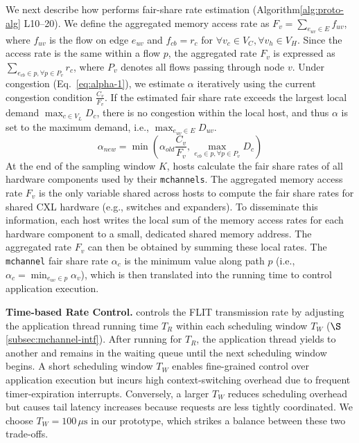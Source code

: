 We next describe how \sys performs fair-share rate estimation (Algorithm\ref{alg:proto-alg} L10--20). We define the aggregated memory access rate as \(F_v = \sum_{e_{uv} \in E} f_{uv}\), where \(f_{uv}\) is the flow on edge \(e_{uv}\) and \(f_{cb} = r_c\) for \(\forall v_c \in V_C, \forall v_h \in V_H\). Since the access rate is the same within a flow \(p\), the aggregated rate \(F_v\) is expressed as \(\sum_{e_{cb} \in p, \forall p \in P_v} r_c\), where \(P_v\) denotes all flows passing through node \(v\). Under congestion (Eq.~\ref{eq:alpha-1}), we estimate \(\alpha\) iteratively using the current congestion condition \(\frac{C_v}{F_v}\). If the estimated fair share rate exceeds the largest local demand \(\max_{c \in V_L} D_c\), there is no congestion within the local host, and thus \(\alpha\) is set to the maximum demand, i.e., \(\max_{e_{uv}\in E} D_{uv}\). %
\begin{equation}
\label{eq:alpha-est}
\alpha_{new} = \min( \alpha_{old} \frac{C_v}{F_v}, \max_{e_{cb} \in p, \forall p \in P_v} D_c )
\end{equation}
At the end of the sampling window \(K\), hosts calculate the fair share rates of all hardware components used by their \texttt{mchannels}. The aggregated memory access rate \(F_v\) is the only variable shared across hosts to compute the fair share rates for shared CXL hardware (e.g., switches and expanders). To disseminate this information, each host writes the local sum of the memory access rates for each hardware component to a small, dedicated shared memory address. The aggregated rate \(F_v\) can then be obtained by summing these local rates. The \texttt{mchannel} fair share rate \(\alpha_c\) is the minimum value along path \(p\) (i.e., \(\alpha_c = \min_{e_{uv} \in p} \alpha_v\)), which is then translated into the running time to control application execution.

 
\noindent
{\bf Time-based Rate Control.} 
\sys controls the FLIT transmission rate by adjusting the application thread running time \(T_R\) within each scheduling window \(T_W\) ($\S$\ref{subsec:mchannel-intf}). After running for \(T_R\), the application thread yields to another and remains in the waiting queue until the next scheduling window begins. A short scheduling window \(T_W\) enables fine-grained control over application execution but incurs high context-switching overhead due to frequent timer-expiration interrupts. Conversely, a larger \(T_W\) reduces scheduling overhead but causes tail latency increases
because requests are less tightly coordinated. We choose \(T_W = 100\,\mu\text{s}\) in our prototype, which strikes a balance between these two trade-offs.



